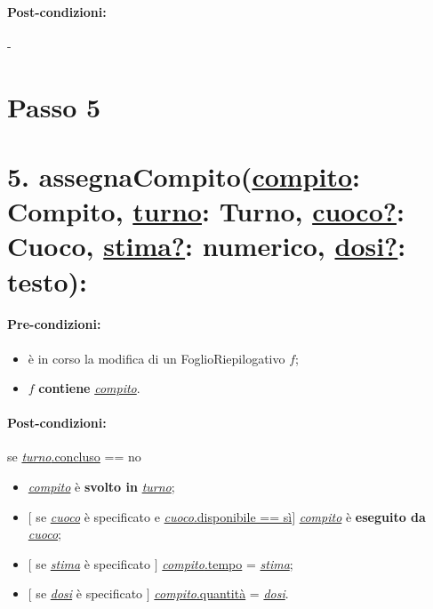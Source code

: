 \paragraph{Post-condizioni:} -


\section{Passo 5}

\section*{5. assegnaCompito(\underline{compito}: Compito, \underline{turno}: Turno, \underline{cuoco?}: Cuoco, \underline{stima?}: numerico, \underline{dosi?}: testo):}

\paragraph{Pre-condizioni:}

\begin{itemize}
    \item è in corso la modifica di un FoglioRiepilogativo $f$;
    \item $f$ \textbf{contiene} \underline{\textit{compito}}.
\end{itemize}

\paragraph{Post-condizioni:} se \underline{\textit{turno}.concluso} == no

\begin{itemize}
    \item \underline{\textit{compito}} è \textbf{svolto in} \underline{\textit{turno}};
    \item $[$ se \underline{\textit{cuoco}} è specificato e \underline{\textit{cuoco}.disponibile == sì}$]$ \underline{\textit{compito}} è \textbf{eseguito da} \underline{\textit{cuoco}};
    \item $[$ se \underline{\textit{stima}} è specificato $]$ \underline{\textit{compito}.tempo} = \underline{\textit{stima}};
    \item $[$ se \underline{\textit{dosi}} è specificato $]$ \underline{\textit{compito}.quantità} = \underline{\textit{dosi}}.
\end{itemize}

